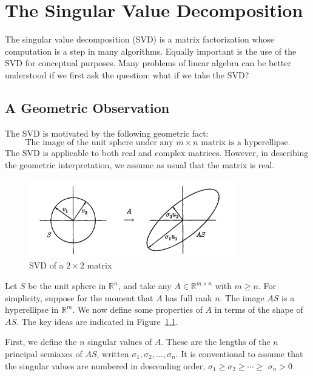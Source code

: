 \chapter{The Singular Value Decomposition}
The singular value decomposition (SVD) is a matrix factorization whose computation is a step in many algorithms. Equally important is the use of the SVD for conceptual purposes. Many problems of linear algebra can be better understood if we first ask the question: what if we take the SVD?

\section{A Geometric Observation}
The SVD is motivated by the following geometric fact:
\[
    \text{The image of the unit sphere under any $m \times n$ matrix is a hyperellipse.}
\]
The SVD is applicable to both real and complex matrices. However, in describing the geometric interpretation, we assume as usual that the matrix is real.

\begin{figure}[H]
    \centering
    \includegraphics[width=0.8\textwidth]{figures/4-1.png}
    \caption{SVD of a $2\times 2$ matrix}
    \label{fig 4.1}
\end{figure}

Let $S$ be the unit sphere in $\mathbb{R}^n$, and take any $A \in \mathbb{R}^{m \times n}$ with $m \geq n$. For simplicity, suppose for the moment that $A$ has full rank $n$. The image $A S$ is a hyperellipse in $\mathbb{R}^m$. We now define some properties of $A$ in terms of the shape of $A S$. The key ideas are indicated in Figure~\ref{fig 4.1}.

First, we define the $n$ singular values of $A$. These are the lengths of the $n$ principal semiaxes of $A S$, written $\sigma_1, \sigma_2, \ldots, \sigma_n$. It is conventional to assume that the singular values are numbered in descending order, $\sigma_1 \geq \sigma_2 \geq \cdots \geq$ $\sigma_n>0$


